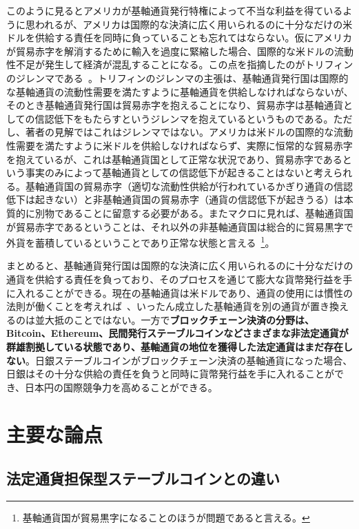 \documentclass[dvipdfmx,a4paper]{jsarticle}
\begin{document}
このように見るとアメリカが基軸通貨発行特権によって不当な利益を得ているように思われるが、アメリカは国際的な決済に広く用いられるのに十分なだけの米ドルを供給する責任を同時に負っていることも忘れてはならない。仮にアメリカが貿易赤字を解消するために輸入を過度に緊縮した場合、国際的な米ドルの流動性不足が発生して経済が混乱することになる。この点を指摘したのがトリフィンのジレンマである~\cite{bordo2019triffin}。トリフィンのジレンマの主張は、基軸通貨発行国は国際的な基軸通貨の流動性需要を満たすように基軸通貨を供給しなければならないが、そのとき基軸通貨発行国は貿易赤字を抱えることになり、貿易赤字は基軸通貨としての信認低下をもたらすというジレンマを抱えているというものである。ただし、著者の見解ではこれはジレンマではない。アメリカは米ドルの国際的な流動性需要を満たすように米ドルを供給しなければならず、実際に恒常的な貿易赤字を抱えているが、これは基軸通貨国として正常な状況であり、貿易赤字であるという事実のみによって基軸通貨としての信認低下が起きることはないと考えられる。基軸通貨国の貿易赤字（適切な流動性供給が行われているかぎり通貨の信認低下は起きない）と非基軸通貨国の貿易赤字（通貨の信認低下が起きうる）は本質的に別物であることに留意する必要がある。またマクロに見れば、基軸通貨国が貿易赤字であるということは、それ以外の非基軸通貨国は総合的に貿易黒字で外貨を蓄積しているということであり正常な状態と言える~\footnote{基軸通貨国が貿易黒字になることのほうが問題であると言える。}。

まとめると、基軸通貨発行国は国際的な決済に広く用いられるのに十分なだけの通貨を供給する責任を負っており、そのプロセスを通じて膨大な貨幣発行益を手に入れることができる。現在の基軸通貨は米ドルであり、通貨の使用には慣性の法則が働くことを考えれば~\cite{goldberg2010international}、いったん成立した基軸通貨を別の通貨が置き換えるのは並大抵のことではない。一方で\textbf{ブロックチェーン決済の分野は、Bitcoin、Ethereum、民間発行ステーブルコインなどさまざまな非法定通貨が群雄割拠している状態であり、基軸通貨の地位を獲得した法定通貨はまだ存在しない}。日銀ステーブルコインがブロックチェーン決済の基軸通貨になった場合、日銀はその十分な供給の責任を負うと同時に貨幣発行益を手に入れることができ、日本円の国際競争力を高めることができる。

\section{主要な論点}

\subsection{法定通貨担保型ステーブルコインとの違い}
\end{document}
